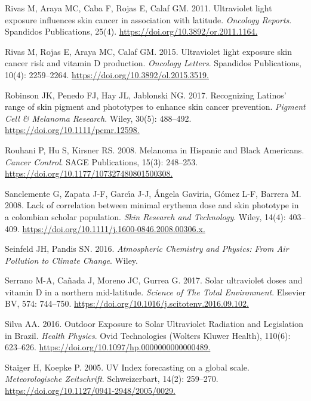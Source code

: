 \documentclass[10pt]{article}
\begin{document}
\label{csl:61}Rivas M, Araya MC, Caba F, Rojas E, Calaf GM. 2011. {Ultraviolet light exposure influences skin cancer in association with latitude}. \textit{Oncology Reports}. Spandidos Publications, 25(4). \url{https://doi.org/10.3892/or.2011.1164.}

\label{csl:62}Rivas M, Rojas E, Araya MC, Calaf GM. 2015. {Ultraviolet light exposure skin cancer risk and vitamin D production}. \textit{Oncology Letters}. Spandidos Publications, 10(4): 2259–2264. \url{https://doi.org/10.3892/ol.2015.3519.}

\label{csl:44}Robinson JK, Penedo FJ, Hay JL, Jablonski NG. 2017. {Recognizing Latinos' range of skin pigment and phototypes to enhance skin cancer prevention}. \textit{Pigment Cell {\&} Melanoma Research}. Wiley, 30(5): 488–492. \url{https://doi.org/10.1111/pcmr.12598.}

\label{csl:38}Rouhani P, Hu S, Kirsner RS. 2008. {Melanoma in Hispanic and Black Americans}. \textit{Cancer Control}. {SAGE} Publications, 15(3): 248–253. \url{https://doi.org/10.1177/107327480801500308.}

\label{csl:72}Sanclemente G, Zapata J-F, Garc{\'{\i}}a J-J, {\'{A}}ngela Gaviria, G{\'{o}}mez L-F, Barrera M. 2008. {Lack of correlation between minimal erythema dose and skin phototype in a colombian scholar population}. \textit{Skin Research and Technology}. Wiley, 14(4): 403–409. \url{https://doi.org/10.1111/j.1600-0846.2008.00306.x.}

\label{csl:10}Seinfeld JH, Pandis SN. 2016. \textit{{Atmospheric Chemistry and Physics: From Air Pollution to Climate Change}}. Wiley.

\label{csl:32}Serrano M-A, Ca{\~{n}}ada J, Moreno JC, Gurrea G. 2017. {Solar ultraviolet doses and vitamin D in a northern mid-latitude}. \textit{Science of The Total Environment}. Elsevier {BV}, 574: 744–750. \url{https://doi.org/10.1016/j.scitotenv.2016.09.102.}

\label{csl:53}Silva AA. 2016. {Outdoor Exposure to Solar Ultraviolet Radiation and Legislation in Brazil}. \textit{Health Physics}. Ovid Technologies (Wolters Kluwer Health), 110(6): 623–626. \url{https://doi.org/10.1097/hp.0000000000000489.}

\label{csl:57}Staiger H, Koepke P. 2005. {{UV} Index forecasting on a global scale}. \textit{Meteorologische Zeitschrift}. Schweizerbart, 14(2): 259–270. \url{https://doi.org/10.1127/0941-2948/2005/0029.}
\end{document}
